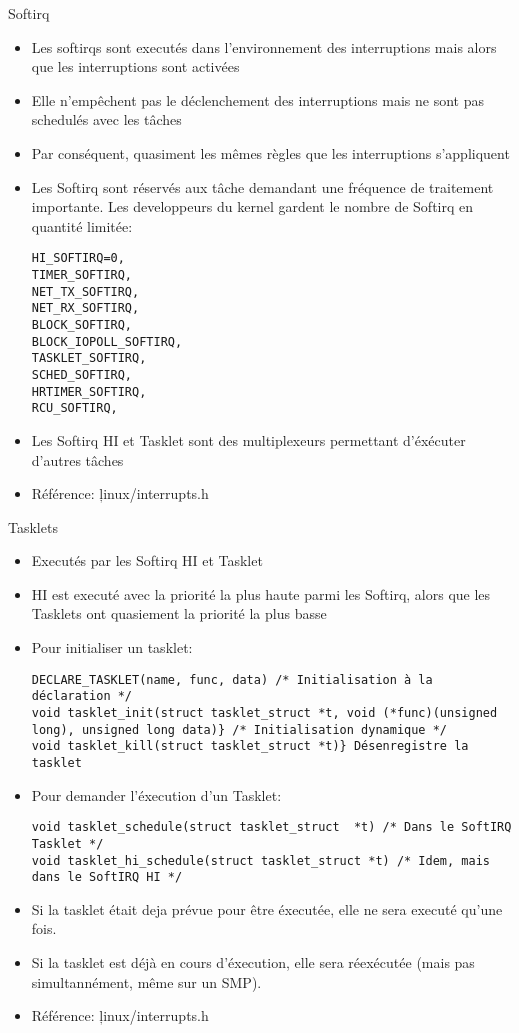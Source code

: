 \begin{frame}[fragile=singleslide]{Softirq}
  \begin{itemize} 
  \item   Les  softirqs   sont  executés   dans   l'environnement  des
    interruptions mais alors que les interruptions sont activées
  \item Elle  n'empêchent pas le déclenchement  des interruptions mais
    ne sont pas schedulés avec les tâches
  \item   Par  conséquent,   quasiment  les   mêmes  règles   que  les
    interruptions s'appliquent
  \item Les Softirq sont réservés aux tâche demandant une fréquence de
    traitement  importante.  Les  developpeurs  du kernel  gardent  le
    nombre de Softirq en quantité limitée:
    \begin{lstlisting} 
HI_SOFTIRQ=0,
TIMER_SOFTIRQ,
NET_TX_SOFTIRQ,
NET_RX_SOFTIRQ,
BLOCK_SOFTIRQ,
BLOCK_IOPOLL_SOFTIRQ,
TASKLET_SOFTIRQ,
SCHED_SOFTIRQ,
HRTIMER_SOFTIRQ,
RCU_SOFTIRQ,
    \end{lstlisting} 
  \item Les Softirq HI et Tasklet sont des multiplexeurs permettant
    d'éxécuter d'autres tâches
  \item Référence: \c{linux/interrupts.h}
  \end{itemize} 
\end{frame}

\begin{frame}[fragile=singleslide]{Tasklets}
  \begin{itemize} 
  \item Executés par les Softirq HI et Tasklet
  \item  HI est  executé  avec la  priorité  la plus  haute parmi  les
    Softirq, alors que les Tasklets ont quasiement la priorité la plus
    basse
  \item Pour initialiser un tasklet:
    \begin{lstlisting} 
DECLARE_TASKLET(name, func, data) /* Initialisation à la déclaration */
void tasklet_init(struct tasklet_struct *t, void (*func)(unsigned long), unsigned long data)} /* Initialisation dynamique */
void tasklet_kill(struct tasklet_struct *t)} Désenregistre la tasklet
    \end{lstlisting} 
  \item Pour demander l'éxecution d'un Tasklet:
    \begin{lstlisting} 
void tasklet_schedule(struct tasklet_struct  *t) /* Dans le SoftIRQ Tasklet */
void tasklet_hi_schedule(struct tasklet_struct *t) /* Idem, mais dans le SoftIRQ HI */
    \end{lstlisting} 
  \item Si  la tasklet était deja  prévue pour être  éxecutée, elle ne
    sera executé qu'une fois.
  \item  Si  la tasklet  est  déjà  en  cours d'éxecution,  elle  sera
    réexécutée (mais pas simultannément, même sur un SMP).
  \item Référence: \c{linux/interrupts.h}
  \end{itemize}
\end{frame} 


